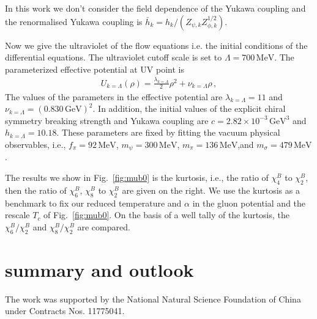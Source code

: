 \documentclass[%
reprint,
superscriptaddress,
showpacs,preprintnumbers,
 amsmath,amssymb,
 aps,
prd,
]{revtex4-1}
\def\Fig#1{Fig.~\ref{#1}} \def\Tab#1{Tab.~\ref{#1}}
\begin{document}
In this work we don't consider the field dependence of the Yukawa coupling and the renormalised Yukawa coupling is $\bar{h}_k=h_k/(Z_{\psi,k}Z^{1/2}_{\phi,k})$.\par
Now we give the ultraviolet of the flow equations i.e. the initial conditions of the differential equations. The ultraviolet cutoff scale is set to $\Lambda=700\,\mathrm{MeV}$. The parameterized effective potential at UV point is
\begin{align}
U_{k=\Lambda}(\rho)=\frac{\lambda_{k=\Lambda}}{2}\rho^2+\nu_{k=\Lambda}\rho\,,
\end{align}
The values of the parameters in the effective potential are $\lambda_{k=\Lambda}=11$ and $\nu_{k=\Lambda}=(0.830\,\mathrm{GeV})^2$. In addition, the initial values of the explicit chiral symmetry breaking strength and Yukawa coupling are $c=2.82\times 10^{-3}\,\mathrm{GeV}^3$ and $h_{k=\Lambda}=10.18$. These parameters are fixed by fitting the vacuum physical observables, i.e., $f_\pi=92\,\mathrm{MeV}$, $m_\psi=300\,\mathrm{MeV}$, $m_\pi=136\,\mathrm{MeV}$,and $m_\sigma=479\,\mathrm{MeV}$.\par  
The results we show in \Fig{fig:mub0} is the kurtosis, i.e., the ratio of $\chi^B_4$ to $\chi^B_2$, then the ratio of $\chi^B_6$, $\chi^B_8$ to $\chi^B_2$ are given on the right. We use the kurtosis as a benchmark to fix our reduced temperature and $\alpha$ in the gluon potential and the rescale $T_c$ of \Fig{fig:mub0}. On the basis of a well tally of the kurtosis, the $\chi^B_6/\chi^B_2$ and $\chi^B_8/\chi^B_2$ are compared. 
\section{summary and outlook}
\label{sec:SO}

\begin{acknowledgments}

The work was supported by the National Natural Science Foundation of China under Contracts Nos. 11775041.

\end{acknowledgments}

\appendix
\end{document}
